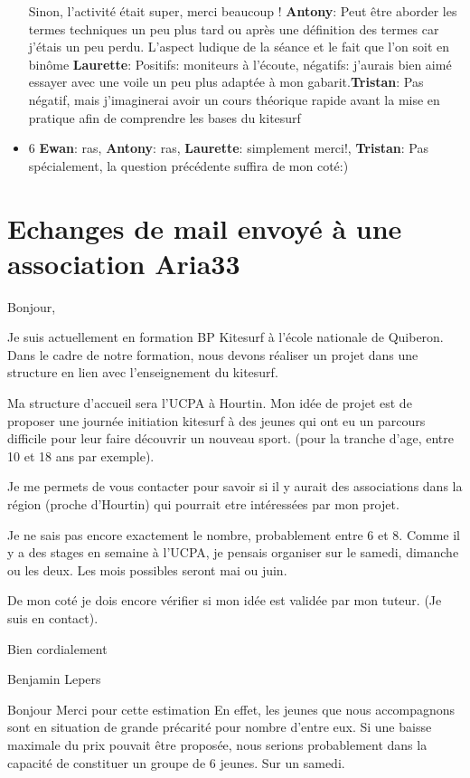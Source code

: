 \documentclass[11pt,a4paper]{report}
\begin{document}
\begin{itemize}
Sinon, l'activité était super, merci beaucoup !
\textbf{Antony}: Peut \^etre aborder les termes techniques un 
peu plus tard ou après une définition des termes car j'étais un
peu perdu. L'aspect ludique de la séance et le fait que l'on
soit en bin\^ome \textbf{Laurette}: Positifs: moniteurs à
l'écoute, négatifs: j'aurais bien aimé essayer avec une
voile un peu plus adaptée à mon gabarit.\textbf{Tristan}: 
Pas négatif, mais j'imaginerai avoir un cours théorique rapide avant
la mise en pratique afin de comprendre les bases du kitesurf
\item 6 \textbf{Ewan}: ras, \textbf{Antony}: ras, 
\textbf{Laurette}: simplement merci!, \textbf{Tristan}: 
Pas spécialement, la question précédente suffira de mon coté:)
\end{itemize}


\chapter{Echanges de mail envoyé à une association Aria33}\label{appendix_mail}
Bonjour,

Je suis actuellement en formation BP Kitesurf à l'école nationale de Quiberon.
Dans le cadre de notre formation, nous devons réaliser un projet dans
une structure en lien avec l'enseignement du kitesurf.

Ma structure d'accueil sera l'UCPA à Hourtin.
Mon idée de projet est de proposer une journée initiation kitesurf à
des jeunes qui ont eu un parcours difficile pour leur faire découvrir
un nouveau sport.
(pour la tranche d'age, entre 10 et 18 ans par exemple).

Je me permets de vous contacter pour savoir si il y aurait des
associations dans la région (proche d'Hourtin) qui pourrait etre
intéressées par mon projet.

Je ne sais pas encore exactement le nombre, probablement entre 6 et 8.
Comme il y a des stages en semaine à l'UCPA, je pensais organiser sur
le samedi, dimanche ou les deux. Les mois possibles seront mai ou
juin.

De mon coté je dois encore vérifier si mon idée est validée par mon
tuteur. (Je suis en contact).


Bien cordialement

Benjamin Lepers

\bigskip
Bonjour
Merci pour cette estimation
En effet, les jeunes que nous accompagnons sont en situation de grande
précarité pour nombre d'entre eux. Si une baisse maximale du prix
pouvait être proposée, nous serions probablement dans la capacité
de constituer un groupe de 6 jeunes. Sur un samedi.
\end{document}
